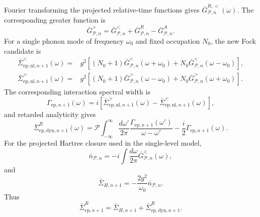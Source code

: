 \documentclass[
 reprint,
 superscriptaddress,
 amsmath,amssymb,
 aps,prb,
 longbibliography,
 floatfix
]{revtex4-2}
\newcommand{\ep}{\mathrm{ep}}
\begin{document}
Fourier transforming the projected relative-time functions gives
\(\bar G_{\mathcal P,n}^{R,<}(\omega)\). The corresponding greater function is
\begin{equation*}
\bar G_{\mathcal P,n}^{>}
=
\bar G_{\mathcal P,n}^{<}
+
\bar G_{\mathcal P,n}^{R}
-
\bar G_{\mathcal P,n}^{A}.
\end{equation*}
For a single phonon mode of frequency \(\omega_0\) and fixed occupation \(N_0\), the new Fock candidate is
\begin{align}
\bar\Sigma_{\ep,\mathrm{nl},n+1}^{<}(\omega)
={}&
g^2
\left[
(N_0+1)
\bar G_{\mathcal P,n}^{<}(\omega+\omega_0)
+
N_0
\bar G_{\mathcal P,n}^{<}(\omega-\omega_0)
\right],
\\
\bar\Sigma_{\ep,\mathrm{nl},n+1}^{>}(\omega)
={}&
g^2
\left[
(N_0+1)
\bar G_{\mathcal P,n}^{>}(\omega-\omega_0)
+
N_0
\bar G_{\mathcal P,n}^{>}(\omega+\omega_0)
\right].
\end{align}
The corresponding interaction spectral width is
\begin{equation*}
\Gamma_{\ep,n+1}(\omega)
=
i
\left[
\bar\Sigma_{\ep,\mathrm{nl},n+1}^{>}(\omega)
-
\bar\Sigma_{\ep,\mathrm{nl},n+1}^{<}(\omega)
\right],
\end{equation*}
and retarded analyticity gives
\begin{equation}
\bar\Sigma_{\ep,\mathrm{dyn},n+1}^{R}(\omega)
=
\mathcal P
\int_{-\infty}^{\infty}
\frac{d\omega'}{2\pi}
\frac{\Gamma_{\ep,n+1}(\omega')}{\omega-\omega'}
-
\frac{i}{2}\Gamma_{\ep,n+1}(\omega).
\label{eq:projected-retarded-from-width}
\end{equation}
For the projected Hartree closure used in the single-level model,
\begin{equation*}
\bar n_{\mathcal P,n}
=
-i
\int\frac{d\omega}{2\pi}
\bar G_{\mathcal P,n}^{<}(\omega),
\end{equation*}
and
\begin{equation*}
\bar\Sigma_{H,n+1}
=
-\frac{2g^2}{\omega_0}
\bar n_{\mathcal P,n}.
\end{equation*}
Thus
\begin{equation*}
\bar\Sigma_{\ep,n+1}^{R}
=
\bar\Sigma_{H,n+1}
+
\bar\Sigma_{\ep,\mathrm{dyn},n+1}^{R}.
\end{equation*}
\end{document}
